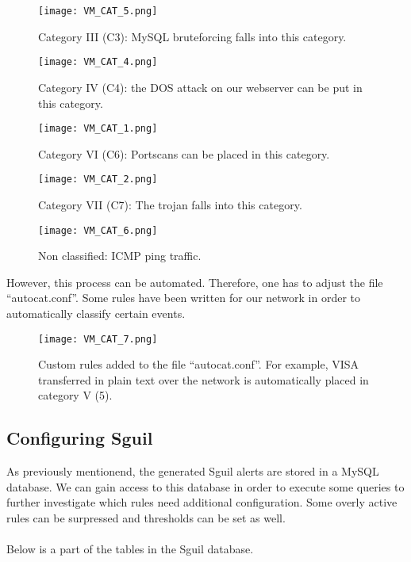 \begin{figure}[h]
    \centering
    \texttt{[image: VM\_CAT\_5.png]}
    \caption{Category III (C3): MySQL bruteforcing falls into this category.}
\end{figure}
\clearpage
\begin{figure}[h]
    \centering
    \texttt{[image: VM\_CAT\_4.png]}
    \caption{Category IV (C4): the DOS attack on our webserver can be put in this category.}
\end{figure}

\begin{figure}[h]
    \centering
    \texttt{[image: VM\_CAT\_1.png]}
    \caption{Category VI (C6): Portscans can be placed in this category.}
\end{figure}

\begin{figure}[h]
    \centering
    \texttt{[image: VM\_CAT\_2.png]}
    \caption{Category VII (C7): The trojan falls into this category.}
\end{figure}
\clearpage
\begin{figure}[h]
    \centering
    \texttt{[image: VM\_CAT\_6.png]}
    \caption{Non classified: ICMP ping traffic.}
\end{figure}

However, this process can be automated. Therefore, one has to adjust the file ``autocat.conf''. Some rules have been written for our network in order to automatically classify certain events.

\begin{figure}[h]
    \centering
    \texttt{[image: VM\_CAT\_7.png]}
    \caption{Custom rules added to the file ``autocat.conf''. For example, VISA transferred in plain text over the network is automatically placed in category V (5).}
\end{figure}

\clearpage

\subsection{Configuring Sguil}

As previously mentionend, the generated Sguil alerts are stored in a MySQL database. We can gain access to this database in order to execute some queries to further investigate which rules need additional configuration. Some overly active rules can be surpressed and thresholds can be set as well. \\ \\
Below is a part of the tables in the Sguil database.


